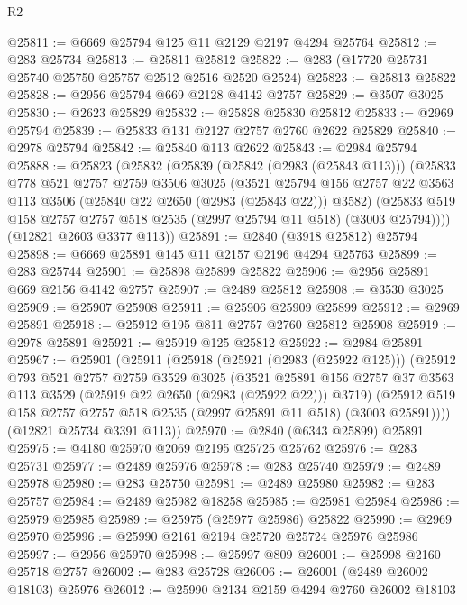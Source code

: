 \begin{lexlean}{R2}
\begin{coremodule}
@25811 := @6669 @25794 @125 @11 @2129 @2197 @4294 @25764
@25812 := @283 @25734
@25813 := @25811 @25812
@25822 := @283 (@17720 @25731 @25740 @25750 @25757 @2512 @2516 @2520 @2524)
@25823 := @25813 @25822
@25828 := @2956 @25794 @669 @2128 @4142 @2757
@25829 := @3507 @3025
@25830 := @2623 @25829
@25832 := @25828 @25830 @25812
@25833 := @2969 @25794
@25839 := @25833 @131 @2127 @2757 @2760 @2622 @25829
@25840 := @2978 @25794
@25842 := @25840 @113 @2622
@25843 := @2984 @25794
@25888 := @25823
    (@25832
      (@25839
        (@25842 (@2983 (@25843 @113)))
        (@25833
          @778
          @521
          @2757
          @2759
          @3506
          @3025
          (@3521
            @25794
            @156
            @2757
            @22
            @3563
            @113
            @3506
            (@25840 @22 @2650 (@2983 (@25843 @22)))
            @3582)
          (@25833 @519 @158 @2757 @2757 @518 @2535 (@2997 @25794 @11 @518) (@3003 @25794))))
      (@12821 @2603 @3377 @113))
@25891 := @2840 (@3918 @25812) @25794
@25898 := @6669 @25891 @145 @11 @2157 @2196 @4294 @25763
@25899 := @283 @25744
@25901 := @25898 @25899 @25822
@25906 := @2956 @25891 @669 @2156 @4142 @2757
@25907 := @2489 @25812
@25908 := @3530 @3025
@25909 := @25907 @25908
@25911 := @25906 @25909 @25899
@25912 := @2969 @25891
@25918 := @25912 @195 @811 @2757 @2760 @25812 @25908
@25919 := @2978 @25891
@25921 := @25919 @125 @25812
@25922 := @2984 @25891
@25967 := @25901
    (@25911
      (@25918
        (@25921 (@2983 (@25922 @125)))
        (@25912
          @793
          @521
          @2757
          @2759
          @3529
          @3025
          (@3521
            @25891
            @156
            @2757
            @37
            @3563
            @113
            @3529
            (@25919 @22 @2650 (@2983 (@25922 @22)))
            @3719)
          (@25912 @519 @158 @2757 @2757 @518 @2535 (@2997 @25891 @11 @518) (@3003 @25891))))
      (@12821 @25734 @3391 @113))
@25970 := @2840 (@6343 @25899) @25891
@25975 := @4180 @25970 @2069 @2195 @25725 @25762
@25976 := @283 @25731
@25977 := @2489 @25976
@25978 := @283 @25740
@25979 := @2489 @25978
@25980 := @283 @25750
@25981 := @2489 @25980
@25982 := @283 @25757
@25984 := @2489 @25982 @18258
@25985 := @25981 @25984
@25986 := @25979 @25985
@25989 := @25975 (@25977 @25986) @25822
@25990 := @2969 @25970
@25996 := @25990 @2161 @2194 @25720 @25724 @25976 @25986
@25997 := @2956 @25970
@25998 := @25997 @809
@26001 := @25998 @2160 @25718 @2757
@26002 := @283 @25728
@26006 := @26001 (@2489 @26002 @18103) @25976
@26012 := @25990 @2134 @2159 @4294 @2760 @26002 @18103

\end{coremodule}
\end{lexlean}
